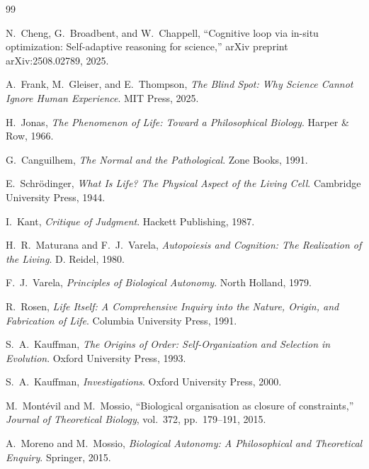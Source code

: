 \documentclass[11pt, a4paper]{article}
\theoremstyle{plain}
\theoremstyle{definition}
\theoremstyle{remark}
\begin{document}
\begin{thebibliography}{99}

N.~Cheng, G.~Broadbent, and W.~Chappell,
\newblock ``Cognitive loop via in-situ optimization: Self-adaptive reasoning for science,''
\newblock arXiv preprint arXiv:2508.02789, 2025.

A.~Frank, M.~Gleiser, and E.~Thompson,
\newblock \emph{The Blind Spot: Why Science Cannot Ignore Human Experience}.
\newblock MIT Press, 2025.

H.~Jonas,
\newblock \emph{The Phenomenon of Life: Toward a Philosophical Biology}.
\newblock Harper \& Row, 1966.

G.~Canguilhem,
\newblock \emph{The Normal and the Pathological}.
\newblock Zone Books, 1991.

E.~Schr\"odinger,
\newblock \emph{What Is Life? The Physical Aspect of the Living Cell}.
\newblock Cambridge University Press, 1944.

I.~Kant,
\newblock \emph{Critique of Judgment}.
\newblock Hackett Publishing, 1987.

H.~R.~Maturana and F.~J.~Varela,
\newblock \emph{Autopoiesis and Cognition: The Realization of the Living}.
\newblock D. Reidel, 1980.

F.~J.~Varela,
\newblock \emph{Principles of Biological Autonomy}.
\newblock North Holland, 1979.

R.~Rosen,
\newblock \emph{Life Itself: A Comprehensive Inquiry into the Nature, Origin, and Fabrication of Life}.
\newblock Columbia University Press, 1991.

S.~A.~Kauffman,
\newblock \emph{The Origins of Order: Self-Organization and Selection in Evolution}.
\newblock Oxford University Press, 1993.

S.~A.~Kauffman,
\newblock \emph{Investigations}.
\newblock Oxford University Press, 2000.

M.~Mont\'evil and M.~Mossio,
\newblock ``Biological organisation as closure of constraints,''
\newblock \emph{Journal of Theoretical Biology}, vol.~372, pp.~179--191, 2015.

A.~Moreno and M.~Mossio,
\newblock \emph{Biological Autonomy: A Philosophical and Theoretical Enquiry}.
\newblock Springer, 2015.


\end{thebibliography}
\end{document}
